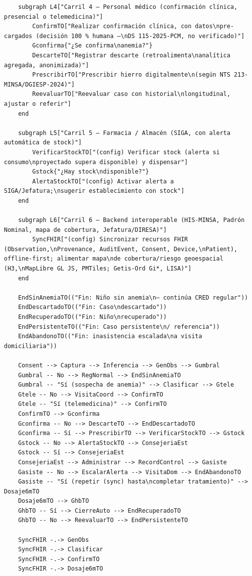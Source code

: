 \documentclass[11pt,a4paper]{article}
\begin{document}
\begin{samepage}
\begin{verbatim}
    subgraph L4["Carril 4 — Personal médico (confirmación clínica, presencial o telemedicina)"]
        ConfirmTO["Realizar confirmación clínica, con datos\npre-cargados (decisión 100 % humana —\nDS 115-2025-PCM, no verificado)"]
        Gconfirma{"¿Se confirma\nanemia?"}
        DescarteTO["Registrar descarte (retroalimenta\nanalítica agregada, anonimizada)"]
        PrescribirTO["Prescribir hierro digitalmente\n(según NTS 213-MINSA/DGIESP-2024)"]
        ReevaluarTO["Reevaluar caso con historial\nlongitudinal, ajustar o referir"]
    end

    subgraph L5["Carril 5 — Farmacia / Almacén (SIGA, con alerta automática de stock)"]
        VerificarStockTO["(config) Verificar stock (alerta si consumo\nproyectado supera disponible) y dispensar"]
        Gstock{"¿Hay stock\ndisponible?"}
        AlertaStockTO["(config) Activar alerta a SIGA/Jefatura;\nsugerir establecimiento con stock"]
    end

    subgraph L6["Carril 6 — Backend interoperable (HIS-MINSA, Padrón Nominal, mapa de cobertura, Jefatura/DIRESA)"]
        SyncFHIR["(config) Sincronizar recursos FHIR (Observation,\nProvenance, AuditEvent, Consent, Device,\nPatient), offline-first; alimentar mapa\nde cobertura/riesgo geoespacial (H3,\nMapLibre GL JS, PMTiles; Getis-Ord Gi*, LISA)"]
    end

    EndSinAnemiaTO(("Fin: Niño sin anemia\n— continúa CRED regular"))
    EndDescartadoTO(("Fin: Caso\ndescartado"))
    EndRecuperadoTO(("Fin: Niño\nrecuperado"))
    EndPersistenteTO(("Fin: Caso persistente\n/ referencia"))
    EndAbandonoTO(("Fin: inasistencia escalada\na visita domiciliaria"))

    Consent --> Captura --> Inferencia --> GenObs --> Gumbral
    Gumbral -- No --> RegNormal --> EndSinAnemiaTO
    Gumbral -- "Sí (sospecha de anemia)" --> Clasificar --> Gtele
    Gtele -- No --> VisitaCoord --> ConfirmTO
    Gtele -- "Sí (telemedicina)" --> ConfirmTO
    ConfirmTO --> Gconfirma
    Gconfirma -- No --> DescarteTO --> EndDescartadoTO
    Gconfirma -- Sí --> PrescribirTO --> VerificarStockTO --> Gstock
    Gstock -- No --> AlertaStockTO --> ConsejeriaEst
    Gstock -- Sí --> ConsejeriaEst
    ConsejeriaEst --> Administrar --> RecordControl --> Gasiste
    Gasiste -- No --> EscalarAlerta --> VisitaDom --> EndAbandonoTO
    Gasiste -- "Sí (repetir (sync) hasta\ncompletar tratamiento)" --> Dosaje6mTO
    Dosaje6mTO --> GhbTO
    GhbTO -- Sí --> CierreAuto --> EndRecuperadoTO
    GhbTO -- No --> ReevaluarTO --> EndPersistenteTO

    SyncFHIR -.-> GenObs
    SyncFHIR -.-> Clasificar
    SyncFHIR -.-> ConfirmTO
    SyncFHIR -.-> Dosaje6mTO
\end{verbatim}\end{samepage}
\end{document}
